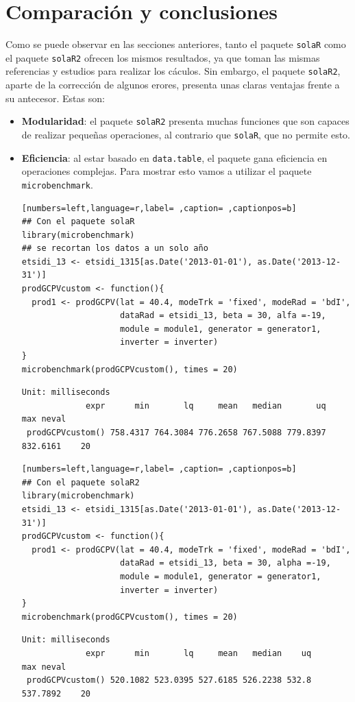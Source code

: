 \section{Comparación y conclusiones}
\label{sec:orgb20842c}
\label{sec:comparacion-conclusiones}
Como se puede observar en las secciones anteriores, tanto el paquete \texttt{solaR} como el paquete \texttt{solaR2} ofrecen los mismos resultados, ya que toman las mismas referencias y estudios para realizar los cáculos. Sin embargo, el paquete \texttt{solaR2}, aparte de la corrección de algunos erores, presenta unas claras ventajas frente a su antecesor. Estas son:
\begin{itemize}
\item \textbf{Modularidad}: el paquete \texttt{solaR2} presenta muchas funciones que son capaces de realizar pequeñas operaciones, al contrario que \texttt{solaR}, que no permite esto.
\item \textbf{Eficiencia}: al estar basado en \texttt{data.table}, el paquete gana eficiencia en operaciones complejas. Para mostrar esto vamos a utilizar el paquete \texttt{microbenchmark}.
\begin{lstlisting}[numbers=left,language=r,label= ,caption= ,captionpos=b]
## Con el paquete solaR
library(microbenchmark)
## se recortan los datos a un solo año
etsidi_13 <- etsidi_1315[as.Date('2013-01-01'), as.Date('2013-12-31')]
prodGCPVcustom <- function(){  
  prod1 <- prodGCPV(lat = 40.4, modeTrk = 'fixed', modeRad = 'bdI',
                    dataRad = etsidi_13, beta = 30, alfa =-19,
                    module = module1, generator = generator1,
                    inverter = inverter)
}
microbenchmark(prodGCPVcustom(), times = 20)
\end{lstlisting}

\begin{verbatim}
Unit: milliseconds
             expr      min       lq     mean   median       uq      max neval
 prodGCPVcustom() 758.4317 764.3084 776.2658 767.5088 779.8397 832.6161    20
\end{verbatim}


\begin{lstlisting}[numbers=left,language=r,label= ,caption= ,captionpos=b]
## Con el paquete solaR2
library(microbenchmark)
etsidi_13 <- etsidi_1315[as.Date('2013-01-01'), as.Date('2013-12-31')]
prodGCPVcustom <- function(){  
  prod1 <- prodGCPV(lat = 40.4, modeTrk = 'fixed', modeRad = 'bdI',
                    dataRad = etsidi_13, beta = 30, alpha =-19,
                    module = module1, generator = generator1,
                    inverter = inverter)
}
microbenchmark(prodGCPVcustom(), times = 20)
\end{lstlisting}

\begin{verbatim}
Unit: milliseconds
             expr      min       lq     mean   median    uq      max neval
 prodGCPVcustom() 520.1082 523.0395 527.6185 526.2238 532.8 537.7892    20
\end{verbatim}
\end{itemize}
